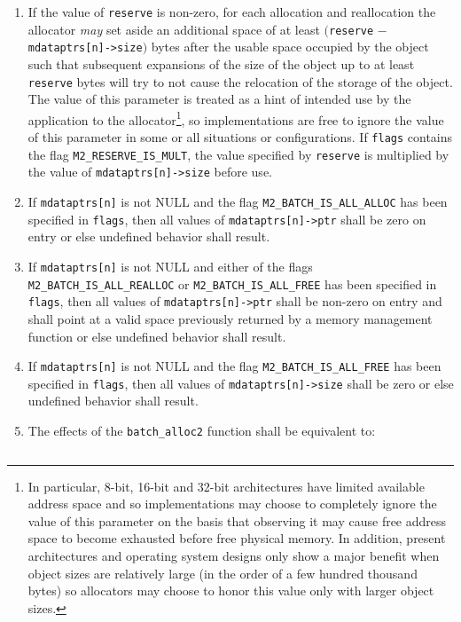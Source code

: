 \documentclass[wd]{isov2}
\begin{document}
{\begin{enumerate}
\begin{enumerate}
\end{enumerate}
\item If the value of \texttt{reserve} is non-zero, for each allocation and reallocation the allocator \emph{may} set aside an additional space of at least $($\texttt{reserve} $-$ \texttt{mdataptrs[n]->size}$)$ bytes after the usable space occupied by the object such that subsequent expansions of the size of the object up to at least \texttt{reserve} bytes will try to not cause the relocation of the storage of the object. The value of this parameter is treated as a hint of intended use by the application to the allocator\footnote{In particular, 8-bit, 16-bit and 32-bit architectures have limited available address space and so implementations may choose to completely ignore the value of this parameter on the basis that observing it may cause free address space to become exhausted before free physical memory. In addition, present architectures and operating system designs only show a major benefit when object sizes are relatively large (in the order of a few hundred thousand bytes) so allocators may choose to honor this value only with larger object sizes.}, so implementations are free to ignore the value of this parameter in some or all situations or configurations. If \texttt{flags} contains the flag \texttt{M2\_RESERVE\_IS\_MULT}, the value specified by \texttt{reserve} is multiplied by the value of \texttt{mdataptrs[n]->size} before use.
\item If \texttt{mdataptrs[n]} is not NULL and the flag \texttt{M2\_BATCH\_IS\_ALL\_ALLOC} has been specified in \texttt{flags}, then all values of \texttt{mdataptrs[n]->ptr} shall be zero on entry or else undefined behavior shall result.
\item If \texttt{mdataptrs[n]} is not NULL and either of the flags \texttt{M2\_BATCH\_IS\_ALL\_REALLOC} or \texttt{M2\_BATCH\_IS\_ALL\_FREE} has been specified in \texttt{flags}, then all values of \texttt{mdataptrs[n]->ptr} shall be non-zero on entry and shall point at a valid space previously returned by a memory management function or else undefined behavior shall result.
\item If \texttt{mdataptrs[n]} is not NULL and the flag \texttt{M2\_BATCH\_IS\_ALL\_FREE} has been specified in \texttt{flags}, then all values of \texttt{mdataptrs[n]->size} shall be zero or else undefined behavior shall result.
\item The effects of the \texttt{batch\_alloc2} function shall be equivalent to:
\begin{verbatim}

\end{verbatim}
\end{enumerate}}
\end{document}
